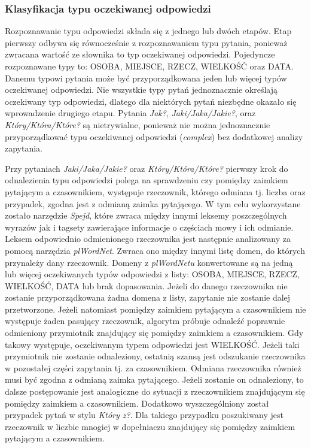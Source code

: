 \subsubsection{Klasyfikacja typu oczekiwanej odpowiedzi}
Rozpoznawanie typu odpowiedzi składa się z jednego lub dwóch etapów. Etap pierwszy odbywa się równocześnie z rozpoznawaniem typu pytania, ponieważ zwracana wartość ze słownika to typ oczekiwanej odpowiedzi. Pojedyncze rozpoznawane typy to: OSOBA, MIEJSCE, RZECZ, WIELKOŚĆ oraz DATA. Danemu typowi pytania może być przyporządkowana jeden lub więcej typów oczekiwanej odpowiedzi. Nie wszystkie typy pytań jednoznacznie określają oczekiwany typ odpowiedzi, dlatego dla niektórych pytań niezbędne okazało się wprowadzenie drugiego etapu. Pytania \emph{Jak?}, \emph{Jaki/Jaka/Jakie?}, oraz \emph{Który/Która/Które?} są nietrywialne, ponieważ nie można jednoznacznie przyporządkować typu oczekiwanej odpowiedzi (\emph{complex}) bez dodatkowej analizy zapytania. 

Przy pytaniach \emph{Jaki/Jaka/Jakie?} oraz \emph{Który/Która/Które?} pierwszy krok do odnalezienia typu odpowiedzi polega na sprawdzeniu czy pomiędzy zaimkiem pytającym a czasownikiem, występuje rzeczownik, którego odmiana tj. liczba oraz przypadek, zgodna jest z odmianą zaimka pytającego. W tym celu wykorzystane zostało narzędzie \emph{Spejd}, które zwraca między innymi leksemy poszczególnych wyrazów jak i tagsety zawierające informacje o częściach mowy i ich odmianie. Leksem odpowiednio odmienionego rzeczownika jest następnie analizowany za pomocą narzędzia \emph{plWordNet}. Zwraca ono między innymi listę domen, do których przynależy dany rzeczownik. Domeny z \emph{plWordNetu} konwertowane są na jedną lub więcej oczekiwanych typów odpowiedzi z listy: OSOBA, MIEJSCE, RZECZ, WIELKOŚĆ, DATA lub brak dopasowania. Jeżeli do danego rzeczownika nie zostanie przyporządkowana żadna domena z listy, zapytanie nie zostanie dalej przetworzone. Jeżeli natomiast pomiędzy zaimkiem pytającym a czasownikiem nie występuje żaden pasujący rzeczownik, algorytm próbuje odnaleźć poprawnie odmieniony przymiotnik znajdujący się pomiędzy zaimkiem a czasownikiem. Gdy takowy występuje, oczekiwanym typem odpowiedzi jest WIELKOŚĆ. 
Jeżeli taki przymiotnik nie zostanie odnaleziony, ostatnią szansą jest odszukanie rzeczownika w pozostałej części zapytania tj. za czasownikiem. Odmiana rzeczownika również musi być zgodna z odmianą zaimka pytającego. Jeżeli zostanie on odnaleziony, to dalsze postępowanie jest analogiczne do sytuacji z rzeczownikiem znajdującym się pomiędzy zaimkiem a czasownikiem. Dodatkowo wyszczególniony został przypadek pytań w stylu \emph{Który z?}. Dla takiego przypadku poszukiwany jest rzeczownik w liczbie mnogiej w dopełniaczu znajdujący się pomiędzy zaimkiem pytającym a czasownikiem.

